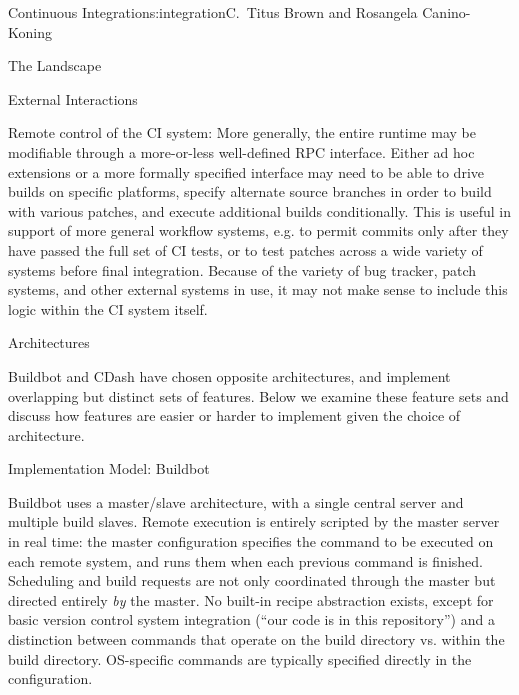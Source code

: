 \begin{aosachapter}{Continuous Integration}{s:integration}{C.\ Titus Brown and Rosangela Canino-Koning}
\begin{aosasect1}{The Landscape}
\begin{aosasect2}{External Interactions}
\begin{aosadescription}
  \item{Remote control of the CI system}: More generally, the
  entire runtime may be modifiable through a more-or-less
  well-defined RPC interface. Either ad hoc extensions or a
  more formally specified interface may need to be able to drive
  builds on specific platforms, specify alternate source branches in order to
  build with various patches, and execute additional builds
  conditionally. This is useful in support of more general workflow
  systems, e.g. to permit commits only after they have passed the
  full set of CI tests, or to test patches across a wide variety of
  systems before final integration. Because of the variety of bug
  tracker, patch systems, and other external systems in use, it may
  not make sense to include this logic within the CI system itself.

\end{aosadescription}

\end{aosasect2}

\end{aosasect1}

\begin{aosasect1}{Architectures}

Buildbot and CDash have chosen opposite architectures, and implement
overlapping but distinct sets of features. Below we examine these
feature sets and discuss how features are easier or harder to
implement given the choice of architecture.

\begin{aosasect2}{Implementation Model: Buildbot}


Buildbot uses a master/slave architecture, with a single central
server and multiple build slaves. Remote execution is entirely
scripted by the master server in real time: the master configuration
specifies the command to be executed on each remote system, and runs
them when each previous command is finished. Scheduling and build
requests are not only coordinated through the master but directed
entirely \emph{by} the master. No built-in recipe abstraction exists,
except for basic version control system integration (``our code is in
this repository'') and a distinction between commands that operate on
the build directory vs. within the build directory. OS-specific
commands are typically specified directly in the configuration.


\end{aosasect2}
\end{aosasect1}
\end{aosachapter}
